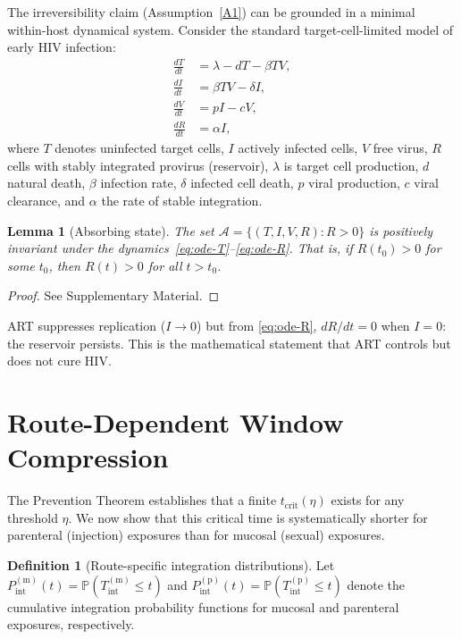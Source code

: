 \documentclass[12pt,a4paper]{article}
\theoremstyle{plain}
\newtheorem{lemma}[theorem]{Lemma}
\theoremstyle{definition}
\newtheorem{definition}[theorem]{Definition}
\theoremstyle{remark}
\newcommand{\Pint}{P_{\mathrm{int}}}
\newcommand{\tcrit}{t_{\mathrm{crit}}}
\newcommand{\Prob}{\mathbb{P}}
\begin{document}
The irreversibility claim (Assumption~\ref{A1}) can be grounded in a minimal within-host dynamical system. Consider the standard target-cell-limited model of early HIV infection:
\begin{align}
    \frac{dT}{dt} &= \lambda - dT - \beta TV, \label{eq:ode-T}\\
    \frac{dI}{dt} &= \beta TV - \delta I, \label{eq:ode-I}\\
    \frac{dV}{dt} &= pI - cV, \label{eq:ode-V}\\
    \frac{dR}{dt} &= \alpha I, \label{eq:ode-R}
\end{align}
where $T$ denotes uninfected target cells, $I$ actively infected cells, $V$ free virus, $R$ cells with stably integrated provirus (reservoir), $\lambda$ is target cell production, $d$ natural death, $\beta$ infection rate, $\delta$ infected cell death, $p$ viral production, $c$ viral clearance, and $\alpha$ the rate of stable integration.

\begin{lemma}[Absorbing state]\label{lem:absorbing}
The set $\mathcal{A} = \{(T,I,V,R) : R > 0\}$ is positively invariant under the dynamics~\eqref{eq:ode-T}--\eqref{eq:ode-R}. That is, if $R(t_0) > 0$ for some $t_0$, then $R(t) > 0$ for all $t > t_0$.
\end{lemma}

\begin{proof}
See Supplementary Material.
\end{proof}


\noindent ART suppresses replication ($I \to 0$) but from \eqref{eq:ode-R}, $dR/dt = 0$ when $I=0$: the reservoir persists. This is the mathematical statement that ART controls but does not cure HIV.


\section{Route-Dependent Window Compression}\label{sec:tcrit}

The Prevention Theorem establishes that a finite $\tcrit(\eta)$ exists for any threshold $\eta$. We now show that this critical time is systematically shorter for parenteral (injection) exposures than for mucosal (sexual) exposures.

\begin{definition}[Route-specific integration distributions]\label{def:route}
Let $\Pint^{(\mathrm{m})}(t) = \Prob(T_{\mathrm{int}}^{(\mathrm{m})} \leq t)$ and $\Pint^{(\mathrm{p})}(t) = \Prob(T_{\mathrm{int}}^{(\mathrm{p})} \leq t)$ denote the cumulative integration probability functions for mucosal and parenteral exposures, respectively.
\end{definition}
\end{document}

